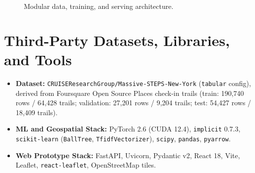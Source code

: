 \documentclass[11pt,a4paper]{article}
\begin{document}
\begin{figure}[ht]
  \centering
  \caption{Modular data, training, and serving architecture.}
  \label{fig:arch}
\end{figure}

\section{Third-Party Datasets, Libraries, and Tools}
\begin{itemize}
  \item \textbf{Dataset:} \texttt{CRUISEResearchGroup/Massive-STEPS-New-York} (\texttt{tabular} config), derived from Foursquare Open Source Places check-in trails (train: 190,740 rows / 64,428 trails; validation: 27,201 rows / 9,204 trails; test: 54,427 rows / 18,409 trails).
  \item \textbf{ML and Geospatial Stack:} PyTorch 2.6 (CUDA 12.4), \texttt{implicit} 0.7.3, \texttt{scikit-learn} (\texttt{BallTree}, \texttt{TfidfVectorizer}), \texttt{scipy}, \texttt{pandas}, \texttt{pyarrow}.
  \item \textbf{Web Prototype Stack:} FastAPI, Uvicorn, Pydantic v2, React 18, Vite, Leaflet, \texttt{react-leaflet}, OpenStreetMap tiles.
\end{itemize}
\end{document}
